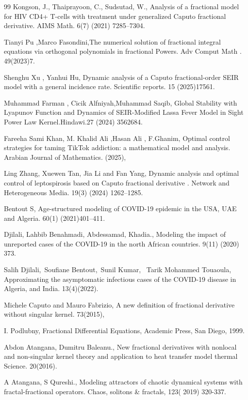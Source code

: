 \documentclass[10pt]{NSP1}
\begin{document}
\begin{thebibliography}{99}
Kongson, J., Thaiprayoon, C., Sudsutad, W., Analysis of a fractional model for HIV CD4+ T-cells with treatment under generalized Caputo fractional derivative. AIMS Math. 6(7) (2021) 7285–7304.

Tianyi Pu ,Marco Fasondini,The numerical solution of fractional integral equations via orthogonal polynomials in fractional Powers. Adv Comput Math . 49(2023)7.

Shenghu Xu , Yanhui Hu, Dynamic analysis of a Caputo fractional-order SEIR model with a general incidence rate. Scientific reports. 15 (2025)17561.

Muhammad Farman , Cicik Alfniyah,Muhammad Saqib, Global Stability with Lyapunov Function and Dynamics of SEIR-Modified Lassa Fever Model in Sight Power Law Kernel.Hindawi.27 (2024) 3562684.

Fareeha Sami Khan, M. Khalid Ali ,Hasan Ali , F.Ghanim, Optimal control strategies for taming TikTok addiction: a mathematical model and analysis. Arabian Journal of Mathematics. (2025),

Ling Zhang, Xuewen Tan, Jia Li and Fan Yang, Dynamic analysis and optimal control of leptospirosis based on Caputo fractional derivative . Network and Heterogeneous Media. 19(3) (2024) 1262–1285.

Bentout S, Age-structured modeling of COVID-19 epidemic in the USA, UAE and Algeria. 60(1) (2021)401–411.

Djilali, Lahbib Benahmadi, Abdessamad, Khadia., Modeling the impact of unreported cases of the COVID-19 in the north African countries. 9(11) (2020) 373.

Salih Djilali, Soufiane Bentout, Sunil Kumar,  Tarik Mohammed Touaoula, Approximating the asymptomatic infectious cases of the COVID-19 disease in Algeria, and India. 13(4)(2022).

Michele Caputo and Mauro Fabrizio, A new deﬁnition of fractional derivative without singular kernel. 73(2015),

I. Podlubny, Fractional Diﬀerential Equations, Academic Press, San Diego, 1999.

Abdon Atangana, Dumitru Baleanu., New fractional derivatives with nonlocal and non-singular kernel theory and application to heat transfer model thermal Science. 20(2016).

A Atangana, S Qureshi., Modeling attractors of chaotic dynamical systems with fractal-fractional operators. Chaos, solitons \& fractals, 123( 2019) 320-337.


\end{thebibliography}
\end{document}
